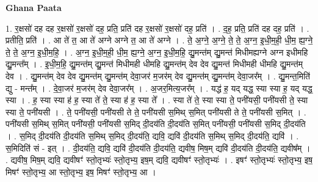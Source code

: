\documentclass[17pt]{extarticle}
\begin{document}
\textbf{Ghana Paata } \newline

1. र॒क्षसो॑ दह दह र॒क्षसो॑ र॒क्षसो॑ दह॒ प्रति॒ प्रति॑ दह र॒क्षसो॑ र॒क्षसो॑ दह॒ प्रति॑ । . द॒ह॒ प्रति॒ प्रति॑ दह दह॒ प्रति॑ । . प्रतीति॒ प्रति॑ । . आ ते॑ त॒ आ ते॑ अग्ने अग्ने त॒ आ ते॑ अग्ने । . ते॒ अ॒ग्ने॒ अ॒ग्ने॒ ते॒ ते॒ अ॒ग्न॒ इ॒धी॒म॒ही॒ धी॒म॒ ह्य॒ग्ने॒ ते॒ ते॒ अ॒ग्न॒ इ॒धी॒म॒हि॒ । . अ॒ग्न॒ इ॒धी॒म॒ही॒ धी॒म॒ ह्य॒ग्ने॒ अ॒ग्न॒ इ॒धी॒म॒हि॒ द्यु॒मन्त॑म् द्यु॒मन्त॑ मिधीमह्यग्ने अग्न इधीमहि द्यु॒मन्त᳚म् । . इ॒धी॒म॒हि॒ द्यु॒मन्त॑म् द्यु॒मन्त॑ मिधीमही धीमहि द्यु॒मन्त॑म् देव देव द्यु॒मन्त॑ मिधीमही धीमहि द्यु॒मन्त॑म् देव । . द्यु॒मन्त॑म् देव देव द्यु॒मन्त॑म् द्यु॒मन्त॑म् देवा॒जर॑ म॒जर॑म् देव द्यु॒मन्त॑म् द्यु॒मन्त॑म् देवा॒जर᳚म् । . द्यु॒मन्त॒मिति॑ द्यु - मन्त᳚म् । . दे॒वा॒जर॑ म॒जर॑म् देव देवा॒जर᳚म् । . अ॒जर॒मित्य॒जर᳚म् । . यद्ध॑ ह॒ यद् यद्ध॒ स्या स्या ह॒ यद् यद्ध॒ स्या । . ह॒ स्या स्या ह॑ ह॒ स्या ते॑ ते॒ स्या ह॑ ह॒ स्या ते᳚ । . स्या ते॑ ते॒ स्या स्या ते॒ पनी॑यसी॒ पनी॑यसी ते॒ स्या स्या ते॒ पनी॑यसी । . ते॒ पनी॑यसी॒ पनी॑यसी ते ते॒ पनी॑यसी स॒मिथ् स॒मित् पनी॑यसी ते ते॒ पनी॑यसी स॒मित् । . पनी॑यसी स॒मिथ् स॒मित् पनी॑यसी॒ पनी॑यसी स॒मिद् दी॒दय॑ति दी॒दय॑ति स॒मित् पनी॑यसी॒ पनी॑यसी स॒मिद् दी॒दय॑ति । . स॒मिद् दी॒दय॑ति दी॒दय॑ति स॒मिथ् स॒मिद् दी॒दय॑ति॒ द्यवि॒ द्यवि॑ दी॒दय॑ति स॒मिथ् स॒मिद् दी॒दय॑ति॒ द्यवि॑ । . स॒मिदिति॑ सं - इत् । . दी॒दय॑ति॒ द्यवि॒ द्यवि॑ दी॒दय॑ति दी॒दय॑ति॒ द्यवीष॒ मिष॒म् द्यवि॑ दी॒दय॑ति दी॒दय॑ति॒ द्यवीष᳚म् । . द्यवीष॒ मिष॒म् द्यवि॒ द्यवीषꣳ॑ स्तो॒तृभ्यः॑ स्तो॒तृभ्य॒ इष॒म् द्यवि॒ द्यवीषꣳ॑ स्तो॒तृभ्यः॑ । . इषꣳ॑ स्तो॒तृभ्यः॑ स्तो॒तृभ्य॒ इष॒ मिषꣳ॑ स्तो॒तृभ्य॒ आ स्तो॒तृभ्य॒ इष॒ मिषꣳ॑ स्तो॒तृभ्य॒ आ । \newline
\end{document}
